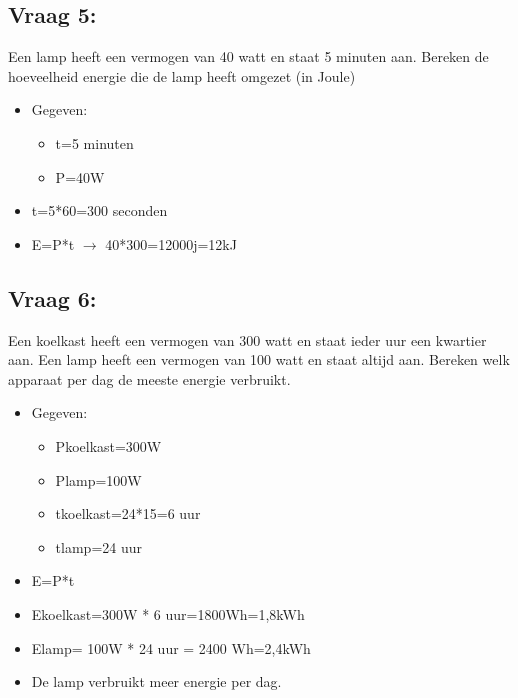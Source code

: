\documentclass[12pt]{article}
\begin{document}
\subsection{Vraag 5:}
Een lamp heeft een vermogen van 40 watt en staat 5 minuten aan. Bereken de hoeveelheid energie die de lamp heeft omgezet (in Joule)
\begin{itemize}
    \item[] Gegeven:\begin{itemize}
        \item t=5 minuten
        \item P=40W
    \end{itemize}
\end{itemize}
\begin{itemize}
    \item t=5*60=300 seconden
    \item E=P*t $\rightarrow$ 40*300=12000j=12kJ
\end{itemize}
\subsection{Vraag 6:}
Een koelkast heeft een vermogen van 300 watt en staat ieder uur een kwartier aan. Een lamp heeft een vermogen van 100 watt en staat altijd aan. Bereken welk apparaat per dag de meeste energie verbruikt.
\begin{itemize}
    \item[] Gegeven:\begin{itemize}
        \item Pkoelkast=300W
        \item Plamp=100W
        \item tkoelkast=24*15=6 uur
        \item tlamp=24 uur
    \end{itemize}
\end{itemize}
\begin{itemize}
    \item E=P*t 
    \item Ekoelkast=300W * 6 uur=1800Wh=1,8kWh
    \item Elamp= 100W * 24 uur = 2400 Wh=2,4kWh
    \item De lamp verbruikt meer energie per dag.
\end{itemize}
\end{document}
